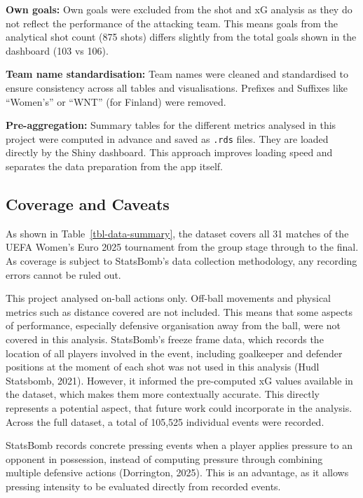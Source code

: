 \documentclass[
  11pt,
  a4paper,
  DIV=11,
  numbers=noendperiod]{scrartcl}
\begin{document}
\textbf{Own goals:} Own goals were excluded from the shot and xG
analysis as they do not reflect the performance of the attacking team.
This means goals from the analytical shot count (875 shots) differs
slightly from the total goals shown in the dashboard (103 vs 106).

\textbf{Team name standardisation:} Team names were cleaned and
standardised to ensure consistency across all tables and visualisations.
Prefixes and Suffixes like ``Women's'' or ``WNT'' (for Finland) were
removed.

\textbf{Pre-aggregation:} Summary tables for the different metrics
analysed in this project were computed in advance and saved as
\texttt{.rds} files. They are loaded directly by the Shiny dashboard.
This approach improves loading speed and separates the data preparation
from the app itself.

\subsection{Coverage and Caveats}\label{coverage-and-caveats}

As shown in Table~\ref{tbl-data-summary}, the dataset covers all 31
matches of the UEFA Women's Euro 2025 tournament from the group stage
through to the final. As coverage is subject to StatsBomb's data
collection methodology, any recording errors cannot be ruled out.

This project analysed on-ball actions only. Off-ball movements and
physical metrics such as distance covered are not included. This means
that some aspects of performance, especially defensive organisation away
from the ball, were not covered in this analysis. StatsBomb's freeze
frame data, which records the location of all players involved in the
event, including goalkeeper and defender positions at the moment of each
shot was not used in this analysis (Hudl Statsbomb, 2021). However, it
informed the pre-computed xG values available in the dataset, which
makes them more contextually accurate. This directly represents a
potential aspect, that future work could incorporate in the analysis.
Across the full dataset, a total of 105,525 individual events were
recorded.

StatsBomb records concrete pressing events when a player applies
pressure to an opponent in possession, instead of computing pressure
through combining multiple defensive actions (Dorrington, 2025). This is
an advantage, as it allows pressing intensity to be evaluated directly
from recorded events.
\end{document}
